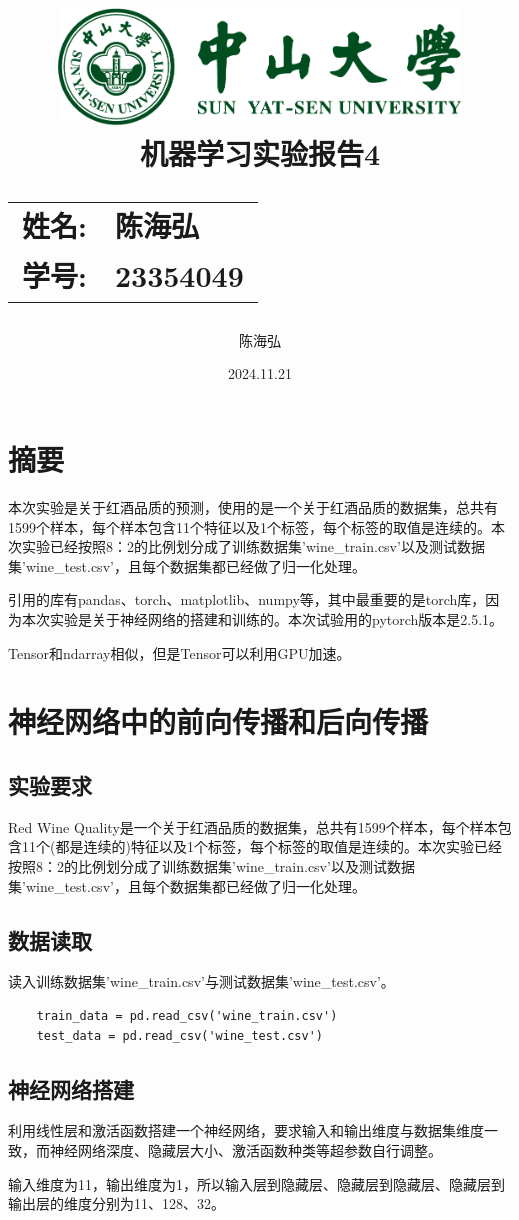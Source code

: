 \documentclass[12pt,a4paper,oneside]{article}
\date{\Large 2024.11.21}
\author{陈海弘}
\title{
    \vspace*{-2cm}
    \includegraphics[width=0.8\textwidth]{SYSULogo.pdf} \\[1em]
    \vfill
    \LARGE \textbf{机器学习实验报告4} \\[1em]
    \Large
    \begin{tabular}{rl}
        \textbf{姓名:} & \textbf{陈海弘} \\
        \textbf{学号:} & \textbf{23354049}
    \end{tabular}
    \vfill
}
\begin{document}
\maketitle
\newpage
\tableofcontents
\newpage

\section{摘要}
\qquad 本次实验是关于红酒品质的预测，使用的是一个关于红酒品质的数据集，总共有1599个样本，每个样本包含11个特征以及1个标签，每个标签的取值是连续的。本次实验已经按照8：2的比例划分成了训练数据集'wine\_train.csv'以及测试数据集'wine\_test.csv'，且每个数据集都已经做了归一化处理。

引用的库有pandas、torch、matplotlib、numpy等，其中最重要的是torch库，因为本次实验是关于神经网络的搭建和训练的。本次试验用的pytorch版本是2.5.1。

Tensor和ndarray相似，但是Tensor可以利用GPU加速。
\section{神经网络中的前向传播和后向传播}
\subsection{实验要求}
\qquad Red Wine Quality是一个关于红酒品质的数据集，总共有1599个样本，每个样本包含11个(都是连续的)特征以及1个标签，每个标签的取值是连续的。本次实验已经按照8：2的比例划分成了训练数据集'wine\_train.csv'以及测试数据集'wine\_test.csv'，且每个数据集都已经做了归一化处理。

\subsection{数据读取}
\qquad 读入训练数据集'wine\_train.csv'与测试数据集'wine\_test.csv'。

\begin{lstlisting}
    train_data = pd.read_csv('wine_train.csv')
    test_data = pd.read_csv('wine_test.csv')
\end{lstlisting}

\subsection{神经网络搭建}
\qquad 利用线性层和激活函数搭建一个神经网络，要求输入和输出维度与数据集维度一致，而神经网络深度、隐藏层大小、激活函数种类等超参数自行调整。

输入维度为11，输出维度为1，所以输入层到隐藏层、隐藏层到隐藏层、隐藏层到输出层的维度分别为11、128、32。
\end{document}
